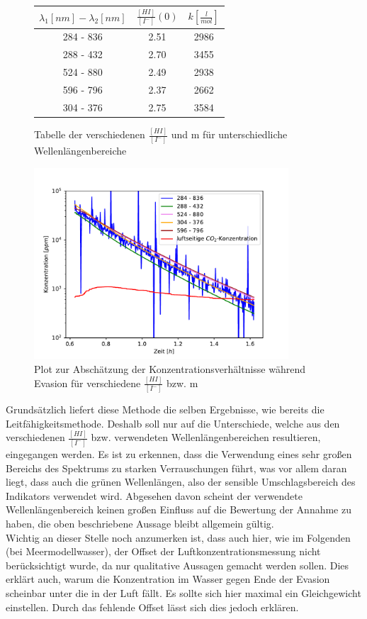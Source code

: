 \documentclass[12pt]{article}
\begin{document}
\begin{figure}[H]
	\centering
	\parbox{57.5mm}{
		\centering
		\begin{tabular}{c|c|c}
			$\lambda_1 [nm] - \lambda_2 [nm]$ & $\frac{[HI]}{[I^-]}(0)$ & $k [\frac{l}{mol}]$ \\ \hline
			284 - 836 & 2.51 & 2986 \\
			288 - 432 & 2.70 & 3455 \\
			524 - 880 & 2.49 & 2938 \\
			596 - 796 & 2.37 & 2662 \\
			304 - 376 & 2.75 & 3584
		\end{tabular}
		\caption{Tabelle der verschiedenen $\frac{[HI]}{[I^-]}$ und m für unterschiedliche Wellenlängenbereiche}
	}
	\hfill%
	\parbox{95mm}{
		\centering
		\includegraphics[width=95mm]{VE-Wasser/Indikator.pdf}
		\caption{Plot zur Abschätzung der Konzentrationsverhältnisse während Evasion für verschiedene $\frac{[HI]}{[I^-]}$ bzw. m}
	}
\end{figure}

Grundsätzlich liefert diese Methode die selben Ergebnisse, wie bereits die Leitfähigkeitsmethode. Deshalb soll nur auf die Unterschiede, welche aus den verschiedenen $\frac{[HI]}{[I^-]}$ bzw. verwendeten Wellenlängenbereichen resultieren, eingegangen werden. Es ist zu erkennen, dass die Verwendung eines sehr großen Bereichs des Spektrums zu starken Verrauschungen führt, was vor allem daran liegt, dass auch die grünen Wellenlängen, also der sensible Umschlagsbereich des Indikators verwendet wird. Abgesehen davon scheint der verwendete Wellenlängenbereich keinen großen Einfluss auf die Bewertung der Annahme zu haben, die oben beschriebene Aussage bleibt allgemein gültig.\\
Wichtig an dieser Stelle noch anzumerken ist, dass auch hier, wie im Folgenden (bei Meermodellwasser), der Offset der Luftkonzentrationsmessung nicht berücksichtigt wurde, da nur qualitative Aussagen gemacht werden sollen. Dies erklärt auch, warum die Konzentration im Wasser gegen Ende der Evasion scheinbar unter die in der Luft fällt. Es sollte sich hier maximal ein Gleichgewicht einstellen. Durch das fehlende Offset lässt sich dies jedoch erklären.
\end{document}
